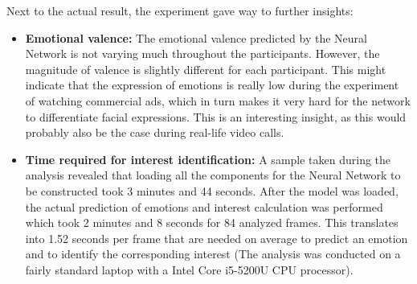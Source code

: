 Next to the actual result, the experiment gave way to further insights:\newline
\begin{itemize}
    \item \textbf{Emotional valence:} The emotional valence predicted by the Neural Network is not varying much throughout the participants. However, the magnitude of valence is slightly different for each participant. This might indicate that the expression of emotions is really low during the experiment of watching commercial ads, which in turn makes it very hard for the network to differentiate facial expressions. This is an interesting insight, as this would probably also be the case during real-life video calls.
    \item \textbf{Time required for interest identification:} A sample taken during the analysis revealed that loading all the components for the Neural Network to be constructed took 3 minutes and 44 seconds. After the model was loaded, the actual prediction of emotions and interest calculation was performed which took 2 minutes and 8 seconds for 84 analyzed frames. This translates into 1.52 seconds per frame that are needed on average to predict an emotion and to identify the corresponding interest (The analysis was conducted on a fairly standard laptop with a Intel Core i5-5200U CPU processor).
\end{itemize}



